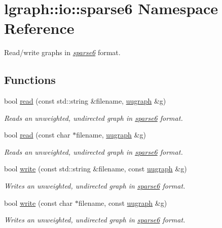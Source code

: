 \hypertarget{namespacelgraph_1_1io_1_1sparse6}{\section{lgraph\-:\-:io\-:\-:sparse6 Namespace Reference}
\label{namespacelgraph_1_1io_1_1sparse6}
}


Read/write graphs in {\itshape \hyperlink{namespacelgraph_1_1io_1_1sparse6}{sparse6}} format.  


\subsection*{Functions}
\begin{DoxyCompactItemize}
\item 
bool \hyperlink{namespacelgraph_1_1io_1_1sparse6_aef4d5e701991e80d99482b20018b03d4}{read} (const std\-::string \&filename, \hyperlink{classlgraph_1_1uugraph}{uugraph} \&g)
\begin{DoxyCompactList}\small\item\em Reads an unweighted, undirected graph in {\itshape \hyperlink{namespacelgraph_1_1io_1_1sparse6}{sparse6}} format. \end{DoxyCompactList}\item 
bool \hyperlink{namespacelgraph_1_1io_1_1sparse6_ae96a7c49cd0f6b70eb6ae23dc18d8588}{read} (const char $\ast$filename, \hyperlink{classlgraph_1_1uugraph}{uugraph} \&g)
\begin{DoxyCompactList}\small\item\em Reads an unweighted, undirected graph in {\itshape \hyperlink{namespacelgraph_1_1io_1_1sparse6}{sparse6}} format. \end{DoxyCompactList}\item 
bool \hyperlink{namespacelgraph_1_1io_1_1sparse6_a4727f803d03a747416ce43acf4cfbb59}{write} (const std\-::string \&filename, const \hyperlink{classlgraph_1_1uugraph}{uugraph} \&g)
\begin{DoxyCompactList}\small\item\em Writes an unweighted, undirected graph in {\itshape \hyperlink{namespacelgraph_1_1io_1_1sparse6}{sparse6}} format. \end{DoxyCompactList}\item 
bool \hyperlink{namespacelgraph_1_1io_1_1sparse6_a851ea580cd4dd91e6239caa76f74b887}{write} (const char $\ast$filename, const \hyperlink{classlgraph_1_1uugraph}{uugraph} \&g)
\begin{DoxyCompactList}\small\item\em Writes an unweighted, undirected graph in {\itshape \hyperlink{namespacelgraph_1_1io_1_1sparse6}{sparse6}} format. \end{DoxyCompactList}\end{DoxyCompactItemize}


